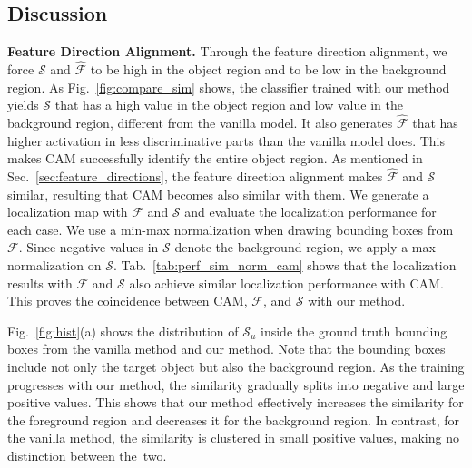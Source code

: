 \subsection{Discussion}
\noindent\textbf{Feature Direction Alignment.}
Through the feature direction alignment, we force $\mathcal{S}$ and $\hat{\mathcal{F}}$ to be high in the object region and to be low in the background region. As Fig.~\ref{fig:compare_sim} shows, the classifier trained with our method yields $\mathcal{S}$ that has a high value in the object region and low value in the background region, different from the vanilla model. It also generates $\hat{\mathcal{F}}$ that has higher activation in less discriminative parts than the vanilla model does.
This makes CAM successfully identify the entire object region. As mentioned in Sec.~\ref{sec:feature_directions}, the feature direction alignment makes $\hat{\mathcal{F}}$ and $\mathcal{S}$ similar, resulting that CAM becomes also similar with them.
We generate a localization map with $\mathcal{F}$ and $\mathcal{S}$ and evaluate the localization performance for each case. We use a min-max normalization when drawing bounding boxes from $\mathcal{F}$. Since negative values in $\mathcal{S}$ denote the background region, we apply a max-normalization on $\mathcal{S}$. Tab.~\ref{tab:perf_sim_norm_cam} shows that the localization results with $\mathcal{F}$ and $\mathcal{S}$ also achieve similar localization performance with CAM. This proves the coincidence between CAM, $\mathcal{F}$, and $\mathcal{S}$ with our method.

Fig.~\ref{fig:hist}(a) shows the distribution of $\mathcal{S}_u$ inside the ground truth bounding boxes from the vanilla method and our method. Note that the bounding boxes include not only the target object but also the background region.
As the training progresses with our method, the similarity gradually splits into negative and large positive values.
This shows that our method effectively increases the similarity for the foreground region and decreases it for the background region.
In contrast, for the vanilla method, the similarity is clustered in small positive values, making no distinction between \mbox{the two}.




